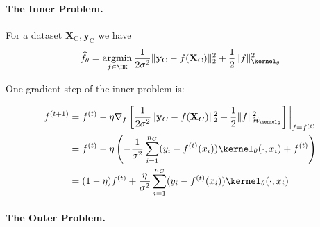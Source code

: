 \documentclass{article}
\begin{document}
\paragraph{The Inner Problem.}
For a dataset $\mathbf{X}_{\text{C}}, \mathbf{y}_{\text{C}}$ we have
\begin{align*}
	\hat{f}_\theta =
	\argmin_{f \in \HK}
	\frac{1}{2\sigma^2} \|\mathbf{y}_{\text{C}} - f(\mathbf{X}_{\text{C}})\|_2^2 + \frac{1}{2} \| f \|_{\kernel_\theta}^2
\end{align*}

One gradient step of the inner problem is:

\begin{align*}
	f^{(t+1)} & = f^{(t)} - \eta \nabla_f \left[\frac{1}{2\sigma^2} \|\mathbf{y}_C - f(\mathbf{X}_C)\|_2^2 + \frac{1}{2}\|f\|_{\mathcal{H}_{\kernel_\theta}}^2\right]\bigg|_{f = f^{(t)}} \\
	          & = f^{(t)} - \eta \left( -\frac{1}{\sigma^2}\sum_{i=1}^{n_C} (y_i - f^{(t)}(x_i)) \kernel_\theta(\cdot, x_i) + f^{(t)} \right)                                             \\
	          & = (1 - \eta) f^{(t)} + \frac{\eta}{\sigma^2} \sum_{i=1}^{n_C} (y_i - f^{(t)}(x_i)) \kernel_\theta(\cdot, x_i)
\end{align*}



\paragraph{The Outer Problem.}





\end{document}
